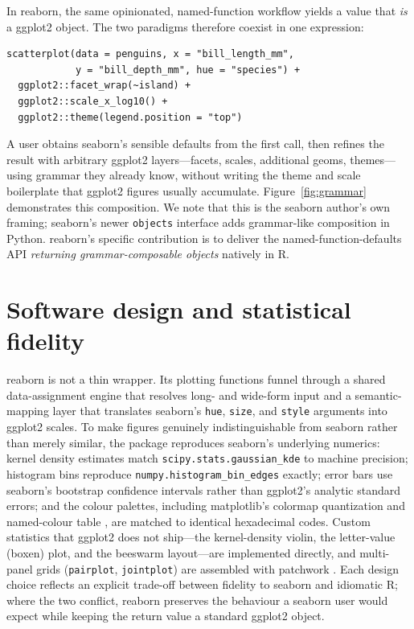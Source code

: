 \documentclass[11pt]{article}
\begin{document}
In reaborn, the same opinionated, named-function workflow yields a value that
\emph{is} a ggplot2 object. The two paradigms therefore coexist in one expression:

\begin{lstlisting}
scatterplot(data = penguins, x = "bill_length_mm",
            y = "bill_depth_mm", hue = "species") +
  ggplot2::facet_wrap(~island) +
  ggplot2::scale_x_log10() +
  ggplot2::theme(legend.position = "top")
\end{lstlisting}

\noindent A user obtains seaborn's sensible defaults from the first call, then
refines the result with arbitrary ggplot2 layers---facets, scales, additional geoms,
themes---using grammar they already know, without writing the theme and scale
boilerplate that ggplot2 figures usually accumulate. Figure~\ref{fig:grammar}
demonstrates this composition. We note that this is the seaborn author's own
framing; seaborn's newer \texttt{objects} interface adds grammar-like composition in
Python. reaborn's specific contribution is to deliver the named-function-defaults
API \emph{returning grammar-composable objects} natively in R.

\section{Software design and statistical fidelity}

reaborn is not a thin wrapper. Its plotting functions funnel through a shared
data-assignment engine that resolves long- and wide-form input \citep{wickham2014tidy}
and a semantic-mapping layer that translates seaborn's \texttt{hue}, \texttt{size},
and \texttt{style} arguments into ggplot2 scales. To make figures genuinely
indistinguishable from seaborn rather than merely similar, the package reproduces
seaborn's underlying numerics: kernel density estimates match
\texttt{scipy.stats.gaussian\_kde} \citep{virtanen2020scipy} to machine precision;
histogram bins reproduce \texttt{numpy.histogram\_bin\_edges} \citep{harris2020numpy}
exactly; error bars use seaborn's bootstrap confidence intervals rather than
ggplot2's analytic standard errors; and the colour palettes, including matplotlib's
colormap quantization and named-colour table \citep{hunter2007matplotlib}, are
matched to identical hexadecimal codes. Custom statistics that ggplot2 does not
ship---the kernel-density violin, the letter-value (boxen) plot, and the beeswarm
layout---are implemented directly, and multi-panel grids (\texttt{pairplot},
\texttt{jointplot}) are assembled with patchwork \citep{patchwork}. Each design
choice reflects an explicit trade-off between fidelity to seaborn and idiomatic R;
where the two conflict, reaborn preserves the behaviour a seaborn user would expect
while keeping the return value a standard ggplot2 object.
\end{document}
